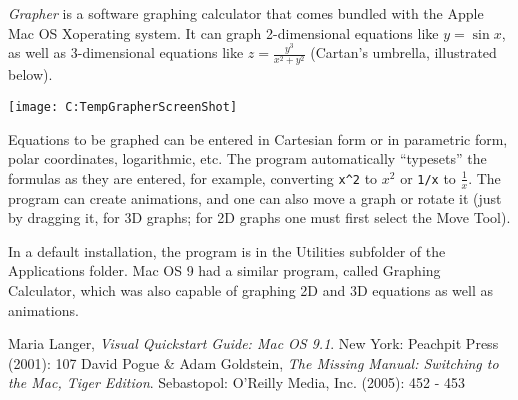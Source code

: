\documentclass[12pt]{article}
\begin{document}
{\em Grapher} is a software graphing calculator that comes bundled with the Apple Mac OS Xoperating system. It can graph 2-dimensional equations like $y = \sin x$, as well as 3-dimensional equations like $z = \frac{y^3}{x^2 + y^2}$ (Cartan's umbrella, illustrated below).

\begin{center}
\texttt{[image: C:TempGrapherScreenShot]}
\end{center}

Equations to be graphed can be entered in Cartesian form or in parametric form, polar coordinates, logarithmic, etc. The program automatically ``typesets'' the formulas as they are entered, for example, converting \verb=x^2= to $x^2$ or \verb=1/x= to $\frac{1}{x}$. The program can create animations, and one can also move a graph or rotate it (just by dragging it, for 3D graphs; for 2D graphs one must first select the Move Tool).

In a default installation, the program is in the Utilities subfolder of the Applications folder. Mac OS 9 had a similar program, called Graphing Calculator, which was also capable of graphing 2D and 3D equations as well as animations.

\begin{thebibliography}{2}
 Maria Langer, {\it Visual Quickstart Guide: Mac OS 9.1}. New York: Peachpit Press (2001): 107
 David Pogue \& Adam Goldstein, {\it The Missing Manual: Switching to the Mac, Tiger Edition}. Sebastopol: O'Reilly Media, Inc. (2005): 452 - 453
\end{thebibliography}
\end{document}
